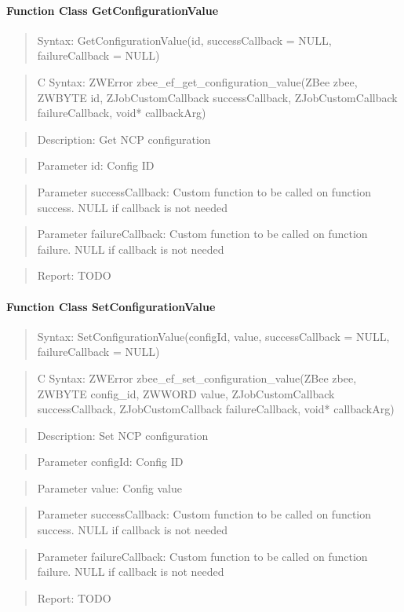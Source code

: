 \paragraph{Function Class GetConfigurationValue}
\begin{quote}Syntax: GetConfigurationValue(id, successCallback = NULL, failureCallback = NULL)\end{quote}
\begin{quote}C Syntax: ZWError zbee\_ef\_get\_configuration\_value(ZBee zbee, ZWBYTE id, ZJobCustomCallback successCallback, ZJobCustomCallback failureCallback, void* callbackArg)\end{quote}
\begin{quote}Description: Get NCP configuration\end{quote}
\begin{quote}Parameter id: Config ID\end{quote}
\begin{quote}Parameter successCallback: Custom function to be called on function success. NULL if callback is not needed\end{quote}
\begin{quote}Parameter failureCallback: Custom function to be called on function failure. NULL if callback is not needed\end{quote}
\begin{quote}Report: TODO\end{quote}

\paragraph{Function Class SetConfigurationValue}
\begin{quote}Syntax: SetConfigurationValue(configId, value, successCallback = NULL, failureCallback = NULL)\end{quote}
\begin{quote}C Syntax: ZWError zbee\_ef\_set\_configuration\_value(ZBee zbee, ZWBYTE config\_id, ZWWORD value, ZJobCustomCallback successCallback, ZJobCustomCallback failureCallback, void* callbackArg)\end{quote}
\begin{quote}Description: Set NCP configuration\end{quote}
\begin{quote}Parameter configId: Config ID\end{quote}
\begin{quote}Parameter value: Config value\end{quote}
\begin{quote}Parameter successCallback: Custom function to be called on function success. NULL if callback is not needed\end{quote}
\begin{quote}Parameter failureCallback: Custom function to be called on function failure. NULL if callback is not needed\end{quote}
\begin{quote}Report: TODO\end{quote}

